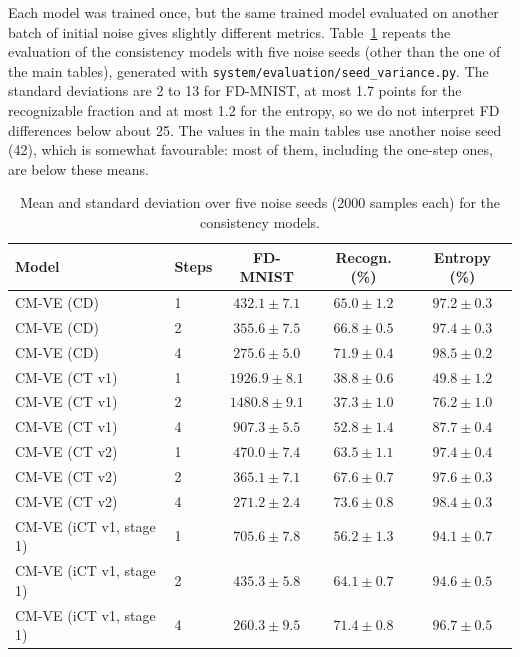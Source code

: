 \documentclass{article}
\begin{document}
Each model was trained once, but the same trained model evaluated on another
batch of initial noise gives slightly different metrics. Table~\ref{tab:variability}
repeats the evaluation of the consistency models with five noise seeds (other
than the one of the main tables), generated with
\texttt{system/evaluation/seed\_variance.py}. The standard deviations are 2 to 13
for FD-MNIST, at most 1.7 points for the recognizable fraction and at most 1.2
for the entropy, so we do not interpret FD differences below about 25. The values
in the main tables use another noise seed (42), which is somewhat favourable: most
of them, including the one-step ones, are below these means.

\begin{table}[H]
  \caption{Mean and standard deviation over five noise seeds (2000 samples each)
  for the consistency models.}
  \label{tab:variability}
  \centering
  \footnotesize
  \begin{tabular}{llccc}
    \toprule
    Model & Steps & FD-MNIST & Recogn. (\%) & Entropy (\%) \\
    \midrule
    CM-VE (CD) & 1 & $432.1 \pm 7.1$ & $65.0 \pm 1.2$ & $97.2 \pm 0.3$ \\
    CM-VE (CD) & 2 & $355.6 \pm 7.5$ & $66.8 \pm 0.5$ & $97.4 \pm 0.3$ \\
    CM-VE (CD) & 4 & $275.6 \pm 5.0$ & $71.9 \pm 0.4$ & $98.5 \pm 0.2$ \\
    \midrule
    CM-VE (CT v1) & 1 & $1926.9 \pm 8.1$ & $38.8 \pm 0.6$ & $49.8 \pm 1.2$ \\
    CM-VE (CT v1) & 2 & $1480.8 \pm 9.1$ & $37.3 \pm 1.0$ & $76.2 \pm 1.0$ \\
    CM-VE (CT v1) & 4 & $907.3 \pm 5.5$ & $52.8 \pm 1.4$ & $87.7 \pm 0.4$ \\
    \midrule
    CM-VE (CT v2) & 1 & $470.0 \pm 7.4$ & $63.5 \pm 1.1$ & $97.4 \pm 0.4$ \\
    CM-VE (CT v2) & 2 & $365.1 \pm 7.1$ & $67.6 \pm 0.7$ & $97.6 \pm 0.3$ \\
    CM-VE (CT v2) & 4 & $271.2 \pm 2.4$ & $73.6 \pm 0.8$ & $98.4 \pm 0.3$ \\
    \midrule
    CM-VE (iCT v1, stage 1) & 1 & $705.6 \pm 7.8$ & $56.2 \pm 1.3$ & $94.1 \pm 0.7$ \\
    CM-VE (iCT v1, stage 1) & 2 & $435.3 \pm 5.8$ & $64.1 \pm 0.7$ & $94.6 \pm 0.5$ \\
    CM-VE (iCT v1, stage 1) & 4 & $260.3 \pm 9.5$ & $71.4 \pm 0.8$ & $96.7 \pm 0.5$ \\

\end{tabular}
\end{table}
\end{document}
